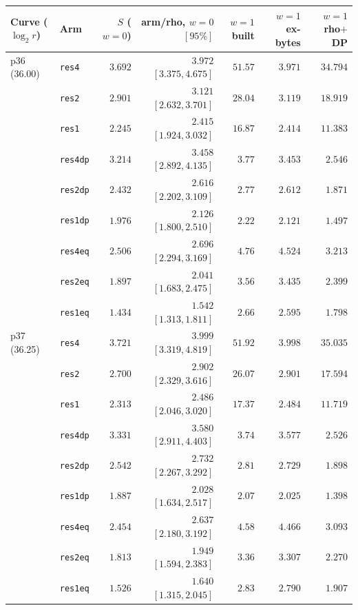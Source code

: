 \begin{table}[t]
\centering\small
\begin{tabular}{@{}llrrrrr@{}}
\toprule
Curve ($\log_2 r$) & Arm & $S$ ($w=0$) & arm/rho, $w=0$ $[95\%]$ & $w=1$ built & $w=1$ ex-bytes & $w=1$ rho$+$DP \\
\midrule
p36 (36.00) & \texttt{res4} & $3.692$ & $3.972$ $[3.375,4.675]$ & $51.57$ & $3.971$ & $34.794$ \\
 & \texttt{res2} & $2.901$ & $3.121$ $[2.632,3.701]$ & $28.04$ & $3.119$ & $18.919$ \\
 & \texttt{res1} & $2.245$ & $2.415$ $[1.924,3.032]$ & $16.87$ & $2.414$ & $11.383$ \\
 & \texttt{res4dp} & $3.214$ & $3.458$ $[2.892,4.135]$ & $3.77$ & $3.453$ & $2.546$ \\
 & \texttt{res2dp} & $2.432$ & $2.616$ $[2.202,3.109]$ & $2.77$ & $2.612$ & $1.871$ \\
 & \texttt{res1dp} & $1.976$ & $2.126$ $[1.800,2.510]$ & $2.22$ & $2.121$ & $1.497$ \\
 & \texttt{res4eq} & $2.506$ & $2.696$ $[2.294,3.169]$ & $4.76$ & $4.524$ & $3.213$ \\
 & \texttt{res2eq} & $1.897$ & $2.041$ $[1.683,2.475]$ & $3.56$ & $3.435$ & $2.399$ \\
 & \texttt{res1eq} & $1.434$ & $1.542$ $[1.313,1.811]$ & $2.66$ & $2.595$ & $1.798$ \\
\addlinespace
p37 (36.25) & \texttt{res4} & $3.721$ & $3.999$ $[3.319,4.819]$ & $51.92$ & $3.998$ & $35.035$ \\
 & \texttt{res2} & $2.700$ & $2.902$ $[2.329,3.616]$ & $26.07$ & $2.901$ & $17.594$ \\
 & \texttt{res1} & $2.313$ & $2.486$ $[2.046,3.020]$ & $17.37$ & $2.484$ & $11.719$ \\
 & \texttt{res4dp} & $3.331$ & $3.580$ $[2.911,4.403]$ & $3.74$ & $3.577$ & $2.526$ \\
 & \texttt{res2dp} & $2.542$ & $2.732$ $[2.267,3.292]$ & $2.81$ & $2.729$ & $1.898$ \\
 & \texttt{res1dp} & $1.887$ & $2.028$ $[1.634,2.517]$ & $2.07$ & $2.025$ & $1.398$ \\
 & \texttt{res4eq} & $2.454$ & $2.637$ $[2.180,3.192]$ & $4.58$ & $4.466$ & $3.093$ \\
 & \texttt{res2eq} & $1.813$ & $1.949$ $[1.594,2.383]$ & $3.36$ & $3.307$ & $2.270$ \\
 & \texttt{res1eq} & $1.526$ & $1.640$ $[1.315,2.045]$ & $2.83$ & $2.790$ & $1.907$ \\

\end{tabular}
\end{table}
